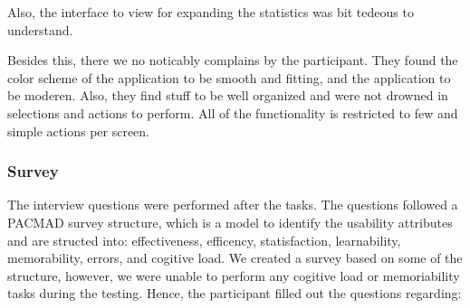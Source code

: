 Also, the interface to view for expanding the statistics was bit tedeous to understand. 

Besides this, there we no noticably complains by the participant. They found the color scheme of the application to be smooth and fitting, and the application to be moderen. Also, they find stuff to be well organized and were not drowned in selections and actions to perform. All of the functionality is restricted to few and simple actions per screen. 

\subsubsection{Survey}
The interview questions were performed after the tasks. The questions followed a PACMAD survey structure, which is a model to identify the usability attributes and are structed into: effectiveness, efficency, statisfaction, learnability, memorability, errors, and cogitive load. We created a survey based on some of the structure, however, we were unable to perform any cogitive load or memoriability tasks during the testing. Hence, the participant filled out the questions regarding: 


